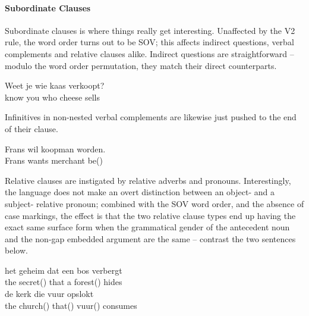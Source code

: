 \paragraph{Subordinate Clauses}
Subordinate clauses is where things really get interesting.
Unaffected by the V2 rule, the word order turns out to be SOV; this affects indirect questions, verbal complements and relative clauses alike.
Indirect questions are straightforward -- modulo the word order permutation, they match their direct counterparts.
\begin{exe}
\ex\label{gloss:embedded_q}
\gll Weet je wie kaas verkoopt?\\
know you who cheese sells\\
\end{exe}
Infinitives in non-nested verbal complements are likewise just pushed to the end of their clause.
\begin{exe}
\ex\label{gloss:simple_vc}
\gll Frans wil koopman worden.\\
Frans wants merchant be()\\
\end{exe}
Relative clauses are instigated by relative adverbs and pronouns.
Interestingly, the language does not make an overt distinction between an object- and a subject- relative pronoun; combined with the SOV word order, and the absence of case markings, the effect is that the two relative clause types end up having the exact same surface form when the grammatical gender of the antecedent noun and the non-gap embedded argument are the same -- contrast the two sentences below.
\begin{exe}
\ex\label{gloss:rc_ambiguity}
\begin{xlist}
\ex
\gll het geheim dat een bos verbergt\\
the secret() that a forest() hides\\
\ex
\gll de kerk die vuur opslokt\\
the church() that() vuur() consumes\\
\end{xlist}
\end{exe}

